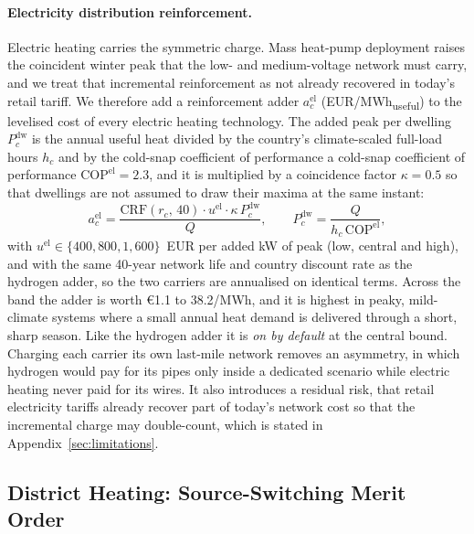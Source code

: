 \paragraph{Electricity distribution reinforcement.} Electric heating carries the
symmetric charge. Mass heat-pump deployment raises the coincident winter peak that
the low- and medium-voltage network must carry, and we treat that incremental
reinforcement as not already recovered in today's retail tariff. We therefore add a
reinforcement adder
$a^{\mathrm{el}}_{c}$ (EUR/MWh\textsubscript{useful}) to the levelised cost of every
electric heating technology. The added peak per dwelling
$P^{\mathrm{dw}}_{c}$ is the annual useful heat divided by the country's
climate-scaled full-load hours $h_c$ and by the cold-snap coefficient of performance
a cold-snap coefficient of performance $\mathrm{COP}^{\mathrm{el}}=2.3$, and it is multiplied by
a coincidence factor $\kappa=0.5$ so that dwellings are not assumed to draw their
maxima at the same instant:
\begin{equation}
a^{\mathrm{el}}_{c}
    = \frac{\mathrm{CRF}(r_c,\,40)\cdot u^{\mathrm{el}}\cdot
            \kappa\, P^{\mathrm{dw}}_{c}}{Q},
\qquad
P^{\mathrm{dw}}_{c} = \frac{Q}{h_c\,\mathrm{COP}^{\mathrm{el}}},
\label{eq:eladder}
\end{equation}
with $u^{\mathrm{el}}\in\{400,800,1{,}600\}$~EUR per added kW of peak (low, central
and high), and with the same 40-year network life and country discount rate as the
hydrogen adder, so the two carriers are annualised on identical terms. Across the
band the adder is worth \euro{}1.1 to 38.2/MWh, and it is highest in peaky, mild-climate
systems where a small annual heat demand is delivered through a short, sharp
season. Like the hydrogen adder it is \emph{on by default} at the central bound.
Charging each carrier its own last-mile network removes an asymmetry, in which
hydrogen would pay for its pipes only inside a dedicated scenario while electric
heating never paid for its wires. It also introduces a
residual risk, that retail electricity tariffs already recover part of today's
network cost so that the incremental charge may double-count, which is stated in
Appendix~\ref{sec:limitations}.


\subsection{District Heating: Source-Switching Merit Order}
\label{sec:results:dhmerit}

